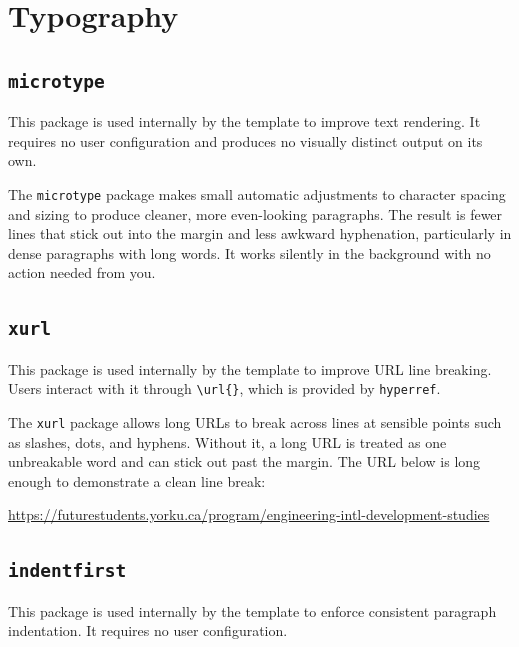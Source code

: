 \section{Typography}

	\subsection{\texttt{microtype}}
	\noindent\colorbox{themecolour!15}{\parbox{\linewidth}{\small This package is used internally by the template to improve text rendering. It requires no user configuration and produces no visually distinct output on its own.}}\vspace{0.5\baselineskip}
	
	The \texttt{microtype} package makes small automatic adjustments to character spacing and sizing to produce cleaner, more even-looking paragraphs. The result is fewer lines that stick out into the margin and less awkward hyphenation, particularly in dense paragraphs with long words. It works silently in the background with no action needed from you.
	
	\subsection{\texttt{xurl}}
	\noindent\colorbox{themecolour!15}{\parbox{\linewidth}{\small This package is used internally by the template to improve URL line breaking. Users interact with it through \texttt{\textbackslash url\{\}}, which is provided by \texttt{hyperref}.}}\vspace{0.5\baselineskip}
	
	The \texttt{xurl} package allows long URLs to break across lines at sensible points such as slashes, dots, and hyphens. Without it, a long URL is treated as one unbreakable word and can stick out past the margin. The URL below is long enough to demonstrate a clean line break:
	
	\url{https://futurestudents.yorku.ca/program/engineering-intl-development-studies}
	
	\subsection{\texttt{indentfirst}}
	\noindent\colorbox{themecolour!15}{\parbox{\linewidth}{\small This package is used internally by the template to enforce consistent paragraph indentation. It requires no user configuration.}}\vspace{0.5\baselineskip}
	
